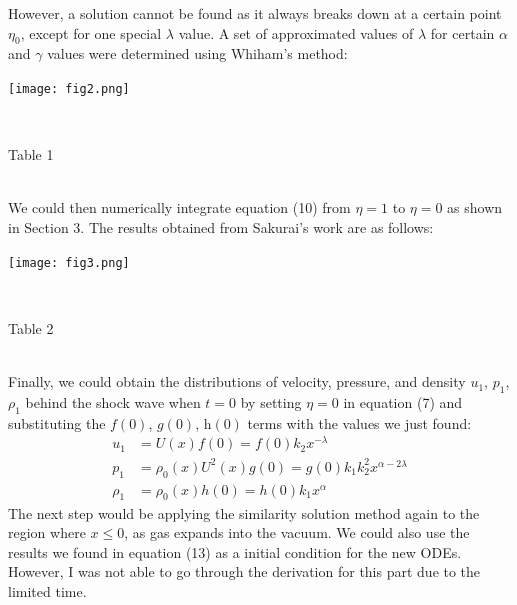 \documentclass{article}
\begin{document}
However, a solution cannot be found as it always breaks down at a certain point $\eta_0$, except for one special $\lambda$ value. A set of approximated values of $\lambda$ for certain $\alpha$ and $\gamma$ values were determined using Whiham's method:
\\
\centerline{\texttt{[image: fig2.png]}}
\\
\centerline{Table 1}
\\
\bigbreak
\newpage
We could then numerically integrate equation (10) from $\eta=1$ to $\eta=0$ as shown in Section 3. The results obtained from Sakurai's work are as follows:
\\
\centerline{\texttt{[image: fig3.png]}}
\\
\centerline{Table 2}
\\
\bigbreak
Finally, we could obtain the distributions of velocity, pressure, and density $\textit{u}_1$, $\textit{p}_1$, $\rho_1$ behind the shock wave when $\textit{t}=0$ by setting $\eta=0$ in equation (7) and substituting the $\textit{f}(0)$, $\textit{g}(0)$, $\textit{h}(0)$ terms with the values we just found:
\begin{equation}
    \begin{split}
        u_{1} &= U(x)f(0) = f(0)k_{2}x^{-\lambda} \\
        p_{1} &= \rho_{0}(x)U^{2}(x)g(0) = g(0)k_{1}k_{2}^{2}x^{\alpha-2\lambda} \\
        \rho_{1} &= \rho_{0}(x)h(0) = h(0)k_{1}x^{\alpha}
    \end{split}
\end{equation}
The next step would be applying the similarity solution method again to the region where $\textit{x}\leqslant0$, as gas expands into the vacuum. We could also use the results we found in equation (13) as a initial condition for the new ODEs. However, I was not able to go through the derivation for this part due to the limited time. 
\end{document}
